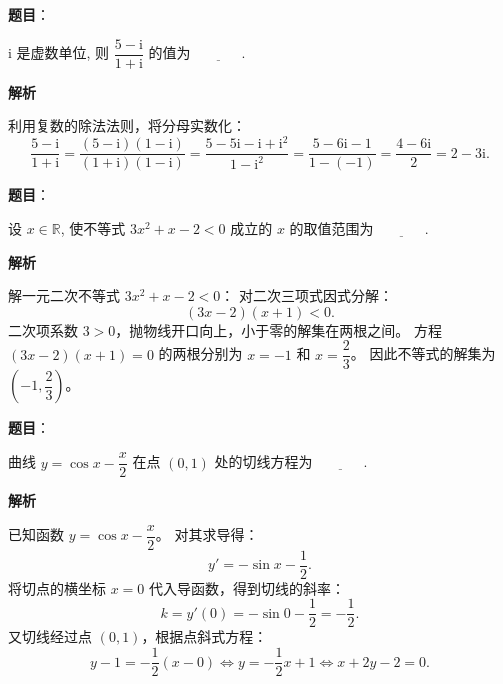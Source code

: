 \begin{answer}

\textbf{题目}：

$\mathrm{i}$ 是虚数单位, 则 $\dfrac{5 - \mathrm{i}}{1 + \mathrm{i}}$ 的值为 $\underline{\phantom{XXXX}}$.

\textbf{解析}

利用复数的除法法则，将分母实数化：
\nopagebreak[4]
\[\frac{5 - \mathrm{i}}{1 + \mathrm{i}} = \frac{(5 - \mathrm{i})(1 - \mathrm{i})}{(1 + \mathrm{i})(1 - \mathrm{i})} = \frac{5 - 5\mathrm{i} - \mathrm{i} + \mathrm{i}^2}{1 - \mathrm{i}^2} = \frac{5 - 6\mathrm{i} - 1}{1 - (-1)} = \frac{4 - 6\mathrm{i}}{2} = 2 - 3\mathrm{i}.\]


\end{answer}
\begin{answer}

\textbf{题目}：

设 $x \in \mathbb{R}$, 使不等式 $3x^2 + x - 2 < 0$ 成立的 $x$ 的取值范围为 $\underline{\phantom{XXXX}}$.

\textbf{解析}

解一元二次不等式 $3x^2 + x - 2 < 0$：
对二次三项式因式分解：
\nopagebreak[4]
\[(3x - 2)(x + 1) < 0.\]
二次项系数 $3 > 0$，抛物线开口向上，小于零的解集在两根之间。
方程 $(3x - 2)(x + 1) = 0$ 的两根分别为 $x = -1$ 和 $x = \dfrac{2}{3}$。
因此不等式的解集为 $\left(-1, \dfrac{2}{3}\right)$。


\end{answer}
\begin{answer}

\textbf{题目}：

曲线 $y = \cos x - \dfrac{x}{2}$ 在点 $(0, 1)$ 处的切线方程为 $\underline{\phantom{XXXX}}$.

\textbf{解析}

已知函数 $y = \cos x - \dfrac{x}{2}$。
对其求导得：
\nopagebreak[4]
\[y' = -\sin x - \frac{1}{2}.\]
将切点的横坐标 $x = 0$ 代入导函数，得到切线的斜率：
\nopagebreak[4]
\[k = y'(0) = -\sin 0 - \frac{1}{2} = -\frac{1}{2}.\]
又切线经过点 $(0, 1)$，根据点斜式方程：
\nopagebreak[4]
\[y - 1 = -\frac{1}{2}(x - 0) \iff y = -\frac{1}{2}x + 1 \iff x + 2y - 2 = 0.\]


\end{answer}
